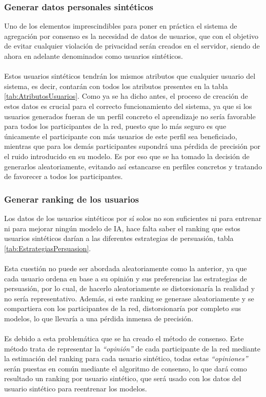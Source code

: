 \subsubsection{Generar datos personales sintéticos}\label{Consenso:Usuarios_Sinteticos}
Uno de los elementos imprescindibles para poner en práctica el sistema de agregación por consenso es la necesidad de datos de usuarios, que con el objetivo de evitar cualquier violación de privacidad serán creados en el servidor, siendo de ahora en adelante denominados como usuarios sintéticos.
\\ \\
Estos usuarios sintéticos tendrán los mismos atributos que cualquier usuario del sistema, es decir, contarán con todos los atributos presentes en la tabla \ref{tab:AtributosUsuarios}. Como ya se ha dicho antes, el proceso de creación de estos datos es crucial para el correcto funcionamiento del sistema, ya que si los usuarios generados fueran de un perfil concreto el aprendizaje no sería favorable para todos los participantes de la red, puesto que lo más seguro es que únicamente el participante con más usuarios de este perfil sea beneficiado, mientras que para los demás participantes supondrá una pérdida de precisión por el ruido introducido en su modelo. Es por eso que se ha tomado la decisión de generarlos aleatoriamente, evitando así estancarse en perfiles concretos y tratando de favorecer a todos los participantes. 
\subsubsection{Generar ranking de los usuarios}
Los datos de los usuarios sintéticos por sí solos no son suficientes ni para entrenar ni para mejorar ningún modelo de IA, hace falta saber el ranking que estos usuarios sintéticos darían a las diferentes estrategias de persuasión, tabla \ref{tab:EstrategiasPersuasion}. 
\\ \\
Esta cuestión no puede ser abordada aleatoriamente como la anterior, ya que cada usuario ordena en base a su opinión y sus preferencias las estrategias de persuasión, por lo cual, de hacerlo aleatoriamente se distorsionaría la realidad y no sería representativo. Además, si este ranking se generase aleatoriamente y se compartiera con los participantes de la red, distorsionaría por completo sus modelos, lo que llevaría a una pérdida inmensa de precisión. 
\\ \\
Es debido a esta problemática que se ha creado el método de consenso. Este método trata de representar la \textit{``opinión''} de cada participante de la red mediante la estimación del ranking para cada usuario sintético, todas estas \textit{``opiniones''} serán puestas en común mediante el algoritmo de consenso, lo que dará como resultado un ranking por usuario sintético, que será usado con los datos del usuario sintético para reentrenar los modelos.
\newpage
